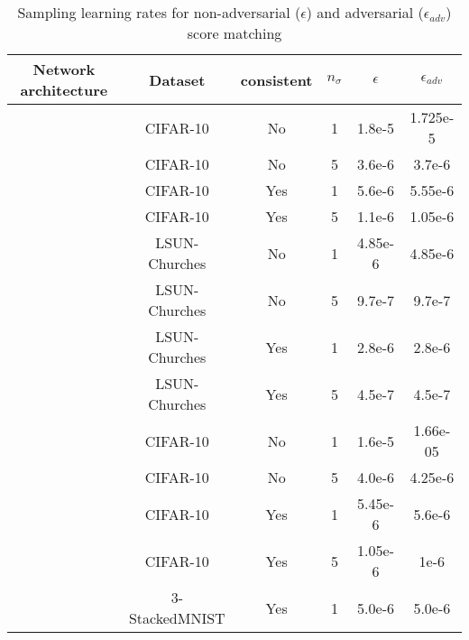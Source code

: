 \documentclass{article} \usepackage{iclr2021_conference_notitle,times}
\theoremstyle{definition}
\theoremstyle{definition}
\begin{document}
\begin{table}[H]
    \caption{Sampling learning rates for non-adversarial ($\epsilon$) and adversarial ($\epsilon_{adv}$) score matching}\label{tab:hyperparameters}
    \begin{center}
    \begin{tabular}{cccc|cc}
    \toprule
    Network architecture & Dataset & consistent & $n_\sigma$ & $\epsilon$ & $\epsilon_{adv}$ \\ 
    \midrule
    \citet{song2020improved} & CIFAR-10 & No & 1 & 1.8e-5 & 1.725e-5\\
    \citet{song2020improved} & CIFAR-10 & No & 5 & 3.6e-6 & 3.7e-6\\
    \citet{song2020improved} & CIFAR-10 & Yes & 1 & 5.6e-6 & 5.55e-6\\
    \citet{song2020improved} & CIFAR-10 & Yes & 5 & 1.1e-6 & 1.05e-6\\
    \hline
    \citet{song2020improved} & LSUN-Churches & No & 1 & 4.85e-6 & 4.85e-6\\
    \citet{song2020improved} & LSUN-Churches & No & 5 & 9.7e-7 & 9.7e-7\\
    \citet{song2020improved} & LSUN-Churches & Yes & 1 & 2.8e-6 & 2.8e-6\\
    \citet{song2020improved} & LSUN-Churches & Yes & 5 & 4.5e-7 & 4.5e-7\\
    \hline
    \citet{ho2020denoising} & CIFAR-10 & No & 1 & 1.6e-5 & 1.66e-05\\
    \citet{ho2020denoising} & CIFAR-10 & No & 5 & 4.0e-6 & 4.25e-6\\
    \citet{ho2020denoising} & CIFAR-10 & Yes & 1 & 5.45e-6 & 5.6e-6\\
    \citet{ho2020denoising} & CIFAR-10 & Yes & 5 & 1.05e-6 & 1e-6\\
    \hline
    \citet{song2020improved} & 3-StackedMNIST & Yes & 1 & 5.0e-6 & 5.0e-6\\
    \bottomrule
    \end{tabular}
    \end{center}
\end{table}
\end{document}
